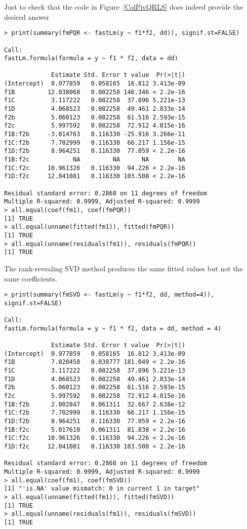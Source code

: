 \documentclass[shortnames,article]{jss}
\begin{document}
Just to check that the code in Figure~\ref{ColPivQRLS} does indeed provide the desired answer

\begin{verbatim}
> print(summary(fmPQR <- fastLm(y ~ f1*f2, dd)), signif.st=FALSE)

Call:
fastLm.formula(formula = y ~ f1 * f2, data = dd)

             Estimate Std. Error t value  Pr(>|t|)
(Intercept)  0.977859   0.058165  16.812 3.413e-09
f1B         12.038068   0.082258 146.346 < 2.2e-16
f1C          3.117222   0.082258  37.896 5.221e-13
f1D          4.068523   0.082258  49.461 2.833e-14
f2b          5.060123   0.082258  61.516 2.593e-15
f2c          5.997592   0.082258  72.912 4.015e-16
f1B:f2b     -3.014763   0.116330 -25.916 3.266e-11
f1C:f2b      7.702999   0.116330  66.217 1.156e-15
f1D:f2b      8.964251   0.116330  77.059 < 2.2e-16
f1B:f2c            NA         NA      NA        NA
f1C:f2c     10.961326   0.116330  94.226 < 2.2e-16
f1D:f2c     12.041081   0.116330 103.508 < 2.2e-16

Residual standard error: 0.2868 on 11 degrees of freedom
Multiple R-squared: 0.9999,	Adjusted R-squared: 0.9999
> all.equal(coef(fm1), coef(fmPQR))
[1] TRUE
> all.equal(unname(fitted(fm1)), fitted(fmPQR))
[1] TRUE
> all.equal(unname(residuals(fm1)), residuals(fmPQR))
[1] TRUE
\end{verbatim}

The rank-revealing SVD method produces the same fitted
values but not the same coefficients.

\begin{verbatim}
> print(summary(fmSVD <- fastLm(y ~ f1*f2, dd, method=4)), signif.st=FALSE)

Call:
fastLm.formula(formula = y ~ f1 * f2, data = dd, method = 4)

             Estimate Std. Error t value  Pr(>|t|)
(Intercept)  0.977859   0.058165  16.812 3.413e-09
f1B          7.020458   0.038777 181.049 < 2.2e-16
f1C          3.117222   0.082258  37.896 5.221e-13
f1D          4.068523   0.082258  49.461 2.833e-14
f2b          5.060123   0.082258  61.516 2.593e-15
f2c          5.997592   0.082258  72.912 4.015e-16
f1B:f2b      2.002847   0.061311  32.667 2.638e-12
f1C:f2b      7.702999   0.116330  66.217 1.156e-15
f1D:f2b      8.964251   0.116330  77.059 < 2.2e-16
f1B:f2c      5.017610   0.061311  81.838 < 2.2e-16
f1C:f2c     10.961326   0.116330  94.226 < 2.2e-16
f1D:f2c     12.041081   0.116330 103.508 < 2.2e-16

Residual standard error: 0.2868 on 11 degrees of freedom
Multiple R-squared: 0.9999,	Adjusted R-squared: 0.9999
> all.equal(coef(fm1), coef(fmSVD))
[1] "'is.NA' value mismatch: 0 in current 1 in target"
> all.equal(unname(fitted(fm1)), fitted(fmSVD))
[1] TRUE
> all.equal(unname(residuals(fm1)), residuals(fmSVD))
[1] TRUE
\end{verbatim}
\end{document}
